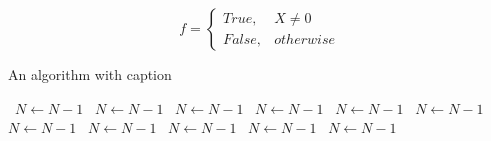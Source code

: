 \documentclass[a4paper]{article}
\begin{document}
\begin{equation}   f =
\begin{cases} True, & X \neq 0\\
False, & otherwise
\end{cases}
\end{equation}

\begin{algorithm}
\caption{An algorithm with caption}
\begin{algorithmic}
\    \State $N \gets N - 1$
\    \State $N \gets N - 1$
\    \State $N \gets N - 1$
\    \State $N \gets N - 1$
\    \State $N \gets N - 1$
\    \State $N \gets N - 1$
\    \State $N \gets N - 1$
\    \State $N \gets N - 1$
\    \State $N \gets N - 1$
\    \State $N \gets N - 1$
\    \State $N \gets N - 1$
\EndWhile
\end{algorithmic}
\end{algorithm}
\end{document}
